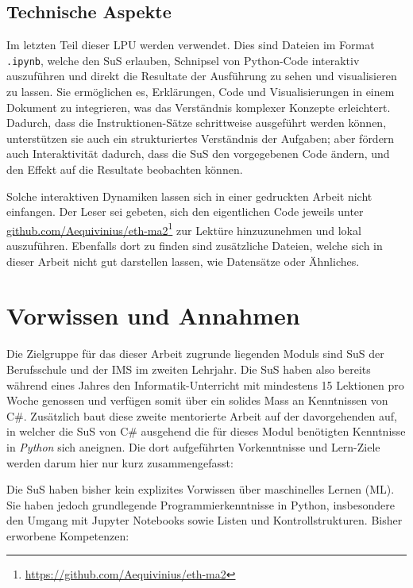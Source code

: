 \documentclass[twocolumn]{article}
\begin{document}
\subsection{Technische Aspekte}
Im letzten Teil dieser LPU werden  verwendet. Dies sind Dateien im Format \texttt{.ipynb}, welche den SuS erlauben, Schnipsel von Python-Code interaktiv auszuführen und direkt die Resultate der Ausführung zu sehen und visualisieren zu lassen. Sie ermöglichen es, Erklärungen, Code und Visualisierungen in einem Dokument zu integrieren, was das Verständnis komplexer Konzepte erleichtert. Dadurch, dass die Instruktionen-Sätze schrittweise ausgeführt werden können, unterstützen sie auch ein strukturiertes Verständnis der Aufgaben; aber fördern auch Interaktivität dadurch, dass die SuS den vorgegebenen Code ändern, und den Effekt auf die Resultate beobachten können.

Solche interaktiven Dynamiken lassen sich in einer gedruckten Arbeit nicht einfangen. Der Leser sei gebeten, sich den eigentlichen Code jeweils unter \href{https://github.com/Aequivinius/eth-ma2}{\url{github.com/Aequivinius/eth-ma2}}\footnote{\url{https://github.com/Aequivinius/eth-ma2}} zur Lektüre hinzuzunehmen und lokal auszuführen. Ebenfalls dort zu finden sind zusätzliche Dateien, welche sich in dieser Arbeit nicht gut darstellen lassen, wie Datensätze oder Ähnliches.

\section{Vorwissen und Annahmen}
\label{sec:vorwissen}

Die Zielgruppe für das dieser Arbeit zugrunde liegenden Moduls sind SuS der Berufsschule und der IMS im zweiten Lehrjahr. Die SuS haben also bereits während eines Jahres den Informatik-Unterricht mit mindestens 15 Lektionen pro Woche genossen und verfügen somit über ein solides Mass an Kenntnissen von C\#. Zusätzlich baut diese zweite mentorierte Arbeit auf der davorgehenden auf, in welcher die SuS von C\# ausgehend die für dieses Modul benötigten Kenntnisse in \textit{Python} sich aneignen. Die dort aufgeführten Vorkenntnisse und Lern-Ziele werden darum hier nur kurz zusammengefasst: 

Die SuS haben bisher kein explizites Vorwissen über maschinelles Lernen (ML). Sie haben jedoch grundlegende Programmierkenntnisse in Python, insbesondere den Umgang mit Jupyter Notebooks sowie Listen und Kontrollstrukturen. Bisher erworbene Kompetenzen:
\end{document}
